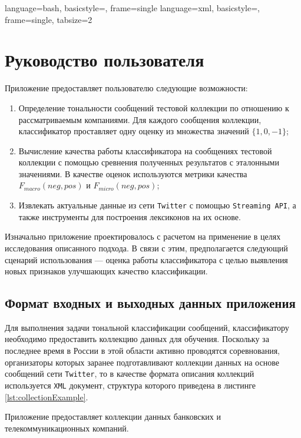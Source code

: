 {
    language=bash,
    basicstyle=\footnotesize,
    frame=single
}
{
    language=xml,
    basicstyle=\tiny,
    frame=single,
    tabsize=2
}


\section{Руководство пользователя}
Приложение предоставляет пользователю следующие возможности:
\begin{enumerate}
    \item Определение тональности сообщений тестовой коллекции по отношению к
    рассматриваемым компаниями. Для каждого сообщения коллекции, классификатор
    проставляет одну оценку из множества значений $\{1, 0, -1\}$;
    \item Вычисление качества работы классификатора на сообщениях тестовой
    коллекции с помощью сревнения полученных результатов с эталонными значениями.
    В качестве оценок используются метрики качества $F_{macro}(neg, pos)$ и
    $F_{micro}(neg, pos)$;
    \item Извлекать актуальные данные из сети {\tt Twitter} с помощью
    {\tt Streaming API}, а также инструменты для построения лексиконов на их
    основе.
\end{enumerate}
Изначально приложение проектировалось с расчетом на применение в целях
исследования описанного подхода. В связи с этим, предполагается следующий
сценарий использования --- оценка работы классификатора с целью выявления новых
признаков улучшающих качество классификации.
    \subsection{Формат входных и выходных данных приложения}
    Для выполнения задачи тональной классификации сообщений, классификатору
    необходимо предоставить коллекцию данных для обучения. Поскольку за последнее
    время в России в этой области активно проводятся соревнования, организаторы
    которых заранее подготавливают коллекции данных на основе сообщений сети
    {\tt Twitter}, то в качестве формата описания коллекций
    используется {\tt XML} документ, структура которого приведена в листинге \ref{lst:collectionExample}.
    \lstset{style=xml}
    
    Приложение предоставляет коллекции данных банковских и телекоммуникационных
    компаний.

